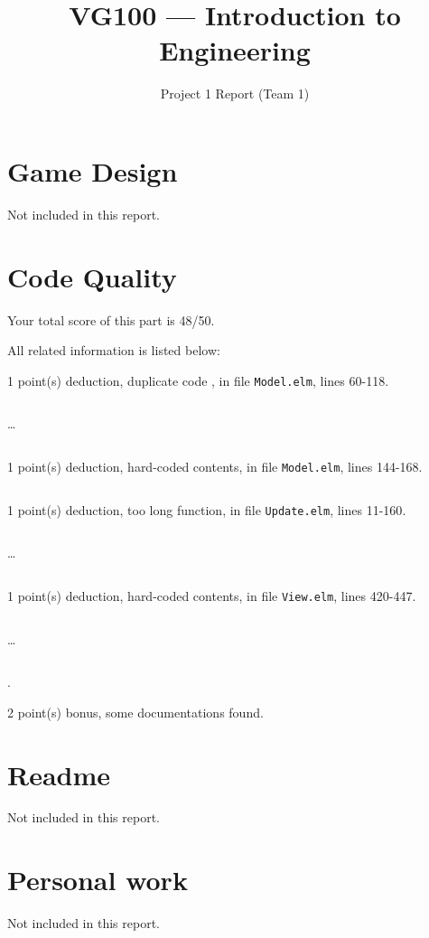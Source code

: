 \documentclass{article}
\title{VG100 --- Introduction to\\ Engineering}
\subtitle{Project 1 Report (Team 1)}
\begin{document}
\maketitle

\section{Game Design}

Not included in this report.

\section{Code Quality}

Your total score of this part is 48/50. \medskip

All related information is listed below: \medskip

1 point(s) {\color{red}deduction}, duplicate code , in file {\color{blue}\texttt{Model.elm}}, lines {\color{blue}60-118}.

\inputminted[firstline=60,lastline=69]{elm}{Model.elm}

\dots

\inputminted[firstline=109,lastline=118]{elm}{Model.elm}

1 point(s) {\color{red}deduction}, hard-coded contents, in file {\color{blue}\texttt{Model.elm}}, lines {\color{blue}144-168}.

\inputminted[firstline=144,lastline=168]{elm}{Model.elm}

1 point(s) {\color{red}deduction}, too long function, in file {\color{blue}\texttt{Update.elm}}, lines {\color{blue}11-160}.

\inputminted[firstline=11,lastline=20]{elm}{Update.elm}

\dots

\inputminted[firstline=151,lastline=160]{elm}{Update.elm}

1 point(s) {\color{red}deduction}, hard-coded contents, in file {\color{blue}\texttt{View.elm}}, lines {\color{blue}420-447}.

\inputminted[firstline=420,lastline=429]{elm}{View.elm}

\dots

\inputminted[firstline=438,lastline=447]{elm}{View.elm}

.\medskip

2 point(s) {\color{red}bonus}, some documentations found.\medskip



\newpage

\section{Readme}

Not included in this report.

\section{Personal work}

Not included in this report.


\newpage
\end{document}
